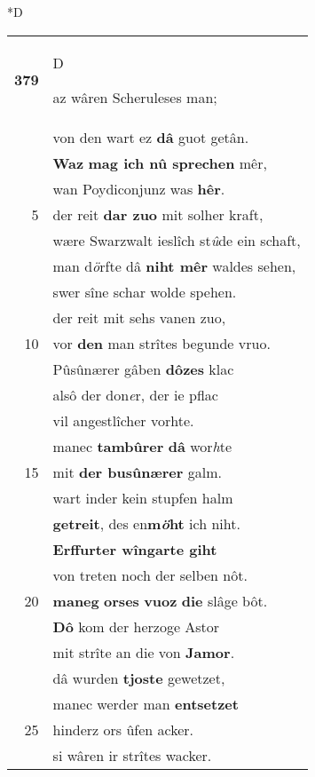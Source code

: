 \documentclass[8pt,a4paper,notitlepage]{article}
\begin{document}
\begin{table}[ht]
\begin{minipage}[t]{0.5\linewidth}
\small
\begin{center}*D
\end{center}
\begin{tabular}{rl}
\textbf{379} & \begin{large}D\end{large}az wâren Scheruleses man;\\ 
 & von den wart ez \textbf{dâ} guot getân.\\ 
 & \textbf{Waz} \textbf{mag ich nû sprechen} mêr,\\ 
 & wan Poydiconjunz was \textbf{hêr}.\\ 
5 & der reit \textbf{dar zuo} mit solher kraft,\\ 
 & wære Swarzwalt ieslîch st\textit{û}de ein schaft,\\ 
 & man d\textit{ö}rfte dâ \textbf{niht mêr} waldes sehen,\\ 
 & swer sîne schar wolde spehen.\\ 
 & der reit mit sehs vanen zuo,\\ 
10 & vor \textbf{den} man strîtes begunde vruo.\\ 
 & Pûsûnærer gâben \textbf{dôzes} klac\\ 
 & alsô der don\textit{e}r, der ie pflac\\ 
 & vil angestlîcher vorhte.\\ 
 & manec \textbf{tambûrer} \textbf{dâ} wor\textit{h}te\\ 
15 & mit \textbf{der busûnærer} galm.\\ 
 & wart inder kein stupfen halm\\ 
 & \textbf{getreit}, des en\textbf{m\textit{ö}ht} ich niht.\\ 
 & \textbf{Erffurter wîngarte giht}\\ 
 & von treten noch der selben nôt.\\ 
20 & \textbf{maneg} \textbf{orses} \textbf{vuoz} \textbf{die} slâge bôt.\\ 
 & \textbf{Dô} kom der herzoge Astor\\ 
 & mit strîte an die von \textbf{Jamor}.\\ 
 & dâ wurden \textbf{tjoste} gewetzet,\\ 
 & manec werder man \textbf{entsetzet}\\ 
25 & hinderz ors ûfen acker.\\ 
 & si wâren ir strîtes wacker.\\ 

\end{tabular}
\end{minipage}
\end{table}
\end{document}
